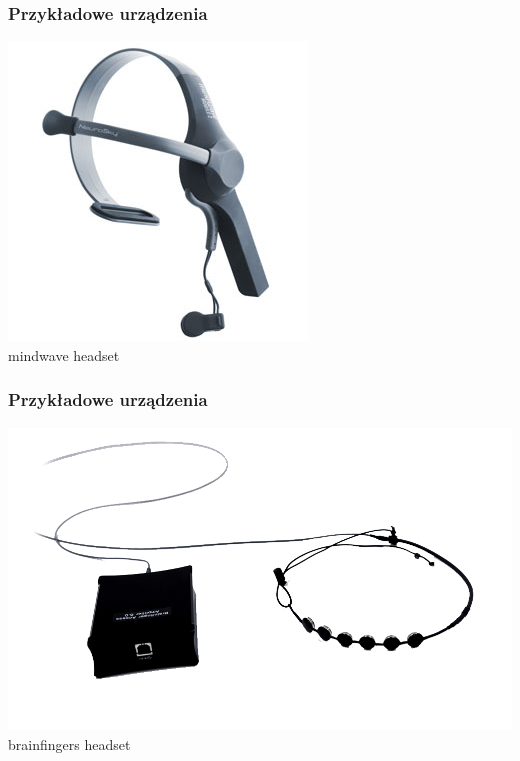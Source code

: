 \documentclass{beamer}
\begin{document}
\begin{frame}
    \frametitle{Przykładowe urządzenia}
    \begin{center}
        \includegraphics[scale=0.5]{mindwave.jpg}
        \\

        {\tiny mindwave headset }
    \end{center}    
\end{frame}

\begin{frame}
    \frametitle{Przykładowe urządzenia}
    \begin{center}
        \includegraphics[scale=0.3]{fingers.png}
        \\

        {\tiny brainfingers headset }
    \end{center}    
\end{frame}
\end{document}
